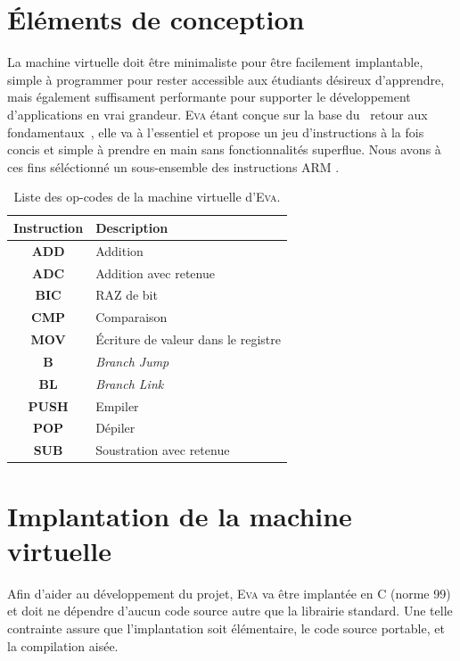 \documentclass[11pt,twoside,french]{article}
\makeatletter
\providecommand{\og}{\leavevmode\flqq~}%
\providecommand{\fg}{\ifdim\lastskip>\z@\unskip\fi~\frqq}%
\newcommand{\noun}[1]{\textsc{#1}}
\newcommand{\noun}[1]{\textsc{#1}}
\makeatother
\begin{document}
\section{Éléments de conception}

La machine virtuelle doit être minimaliste pour être facilement implantable,
simple à programmer pour rester accessible aux étudiants désireux
d'apprendre, mais également suffisament performante pour supporter
le développement d'applications en vrai grandeur. \noun{Eva} étant
conçue sur la base du \og retour aux fondamentaux\fg , elle va à l'essentiel
et propose un jeu d'instructions à la fois concis et simple à prendre
en main sans fonctionnalités superflue. Nous avons à ces fins séléctionné
un sous-ensemble des instructions ARM .

\begin{table}[bp]
\begin{centering}
\begin{tabular}{|c|l|}
\hline
\textbf{Instruction} & \textbf{Description}\\
\hline
\hline
\textbf{ADD} & Addition\\
\hline
\textbf{ADC} & Addition avec retenue\\
\hline
\textbf{BIC} & RAZ de bit\\
\hline
\textbf{CMP} & Comparaison\\
\hline
\textbf{MOV} & Écriture de valeur dans le registre\\
\hline
\textbf{B} & \emph{Branch Jump}\\
\hline
\textbf{BL} & \emph{Branch Link}\\
\hline
\textbf{PUSH} & Empiler\\
\hline
\textbf{POP} & Dépiler\\
\hline
\textbf{SUB} & Soustration avec retenue\\
\hline
\end{tabular}
\par\end{centering}
\caption{Liste des op-codes de la machine virtuelle d'\noun{Eva}.}
\label{tab:opcodes}
\end{table}


\section{Implantation de la machine virtuelle}

Afin d'aider au développement du projet, \noun{Eva} va être implantée
en C (norme 99) et doit ne dépendre d'aucun code source autre que
la librairie standard. Une telle contrainte assure que l'implantation
soit élémentaire, le code source portable, et la compilation aisée.
\end{document}
